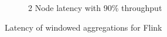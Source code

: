 \begin{figure}
\begin{subfigure}[b]{0.3\textwidth}
        \caption{2 Node latency with 90\% throughput }
    \end{subfigure}




        \caption{Latency of windowed aggregations for Flink}
\end{figure}